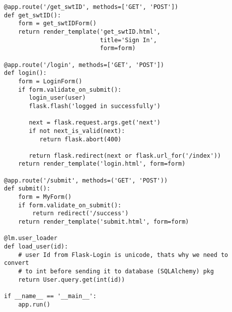 \documentclass[11pt]{article}
\begin{document}
\begin{verbatim}
@app.route('/get_swtID', methods=['GET', 'POST'])
def get_swtID():
    form = get_swtIDForm()
    return render_template('get_swtID.html',
                           title='Sign In',
                           form=form)

@app.route('/login', methods=['GET', 'POST'])
def login():
    form = LoginForm()
    if form.validate_on_submit():
       login_user(user)
       flask.flash('logged in successfully')

       next = flask.request.args.get('next')
       if not next_is_valid(next):
          return flask.abort(400)

       return flask.redirect(next or flask.url_for('/index'))
    return render_template('login.html', form=form)

@app.route('/submit', methods=('GET', 'POST'))
def submit():
    form = MyForm()
    if form.validate_on_submit():
        return redirect('/success')
    return render_template('submit.html', form=form)

@lm.user_loader
def load_user(id):
    # user Id from Flask-Login is unicode, thats why we need to convert
    # to int before sending it to database (SQLAlchemy) pkg
    return User.query.get(int(id))  

if __name__ == '__main__':
    app.run()
\end{verbatim}
\end{document}
